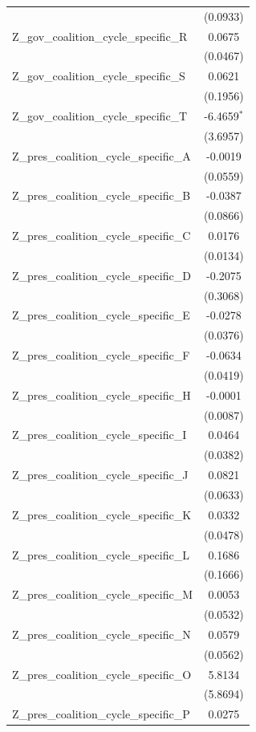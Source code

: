 \begin{tabular}{lc}
 & (0.0933) \\
Z\_gov\_coalition\_cycle\_specific\_R & 0.0675 \\
 & (0.0467) \\
Z\_gov\_coalition\_cycle\_specific\_S & 0.0621 \\
 & (0.1956) \\
Z\_gov\_coalition\_cycle\_specific\_T & -6.4659$^{*}$ \\
 & (3.6957) \\
Z\_pres\_coalition\_cycle\_specific\_A & -0.0019 \\
 & (0.0559) \\
Z\_pres\_coalition\_cycle\_specific\_B & -0.0387 \\
 & (0.0866) \\
Z\_pres\_coalition\_cycle\_specific\_C & 0.0176 \\
 & (0.0134) \\
Z\_pres\_coalition\_cycle\_specific\_D & -0.2075 \\
 & (0.3068) \\
Z\_pres\_coalition\_cycle\_specific\_E & -0.0278 \\
 & (0.0376) \\
Z\_pres\_coalition\_cycle\_specific\_F & -0.0634 \\
 & (0.0419) \\
Z\_pres\_coalition\_cycle\_specific\_H & -0.0001 \\
 & (0.0087) \\
Z\_pres\_coalition\_cycle\_specific\_I & 0.0464 \\
 & (0.0382) \\
Z\_pres\_coalition\_cycle\_specific\_J & 0.0821 \\
 & (0.0633) \\
Z\_pres\_coalition\_cycle\_specific\_K & 0.0332 \\
 & (0.0478) \\
Z\_pres\_coalition\_cycle\_specific\_L & 0.1686 \\
 & (0.1666) \\
Z\_pres\_coalition\_cycle\_specific\_M & 0.0053 \\
 & (0.0532) \\
Z\_pres\_coalition\_cycle\_specific\_N & 0.0579 \\
 & (0.0562) \\
Z\_pres\_coalition\_cycle\_specific\_O & 5.8134 \\
 & (5.8694) \\
Z\_pres\_coalition\_cycle\_specific\_P & 0.0275 \\

\end{tabular}
